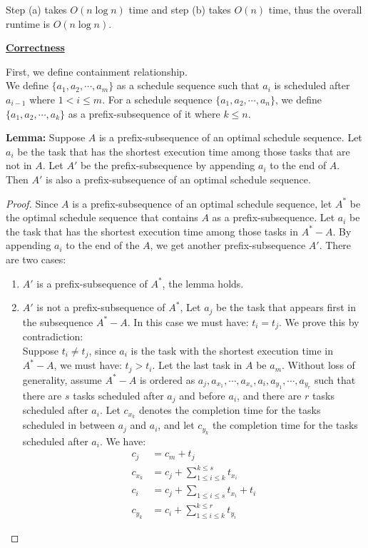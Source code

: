 \documentclass[11pt]{article}
\begin{document}
\begin{enumerate}
\begin{enumerate}
Step (a) takes $O(n\log n)$ time and step (b) takes $O(n)$ time, thus
the overall runtime is $O(n\log n)$.

\underline{\textbf{Correctness}}

First, we define containment relationship.\\
We define $\{a_1,a_2,\cdots,a_m\}$ as a schedule sequence such that $a_i$
is scheduled after $a_{i-1}$ where $1 < i \leq m$.
For a schedule sequence $\{a_1,a_2,\cdots,a_n\}$, we define
$\{a_1,a_2,\cdots,a_k\}$ as a prefix-subsequence of it where $k \leq n$.

\textbf{Lemma:} Suppose $A$ is a prefix-subsequence of an optimal schedule
sequence. Let $a_i$ be the task that has the shortest execution time
among those tasks that are not in $A$. Let $A'$ be the
prefix-subsequence by appending $a_i$ to the end of $A$.
Then $A'$ is also a prefix-subsequence of an optimal schedule sequence.

\begin{proof}
  Since $A$ is a prefix-subsequence of an optimal schedule sequence,
  let $A^*$ be the optimal schedule sequence that contains $A$ as a
  prefix-subsequence. Let $a_i$ be the task that has the shortest
  execution time among those tasks in $A^*-A$. By appending $a_i$ to
  the end of the $A$, we get another prefix-subsequence $A'$. There
  are two cases:
  \begin{enumerate}
  \item $A'$ is a prefix-subsequence of $A^*$, the lemma holds.
  \item $A'$ is not a prefix-subsequence of $A^*$, Let $a_j$ be the
    task that appears first in the subsequence $A^*-A$. In
    this case we must have: $t_i = t_j$. We prove this by 
    contradiction:\\
    Suppose $t_i \neq t_j$, since $a_i$ is the task with the shortest
    execution time in $A^*-A$, we must have: $t_j > t_i$. Let the last
    task in $A$ be $a_m$. Without loss of generality, assume $A^*-A$
    is ordered as
    $a_j,a_{x_1},\cdots,a_{x_s},a_i,a_{y_1},\cdots,a_{y_r}$ such that
    there are $s$ tasks scheduled after $a_j$ and before $a_i$, and
    there are $r$ tasks scheduled after $a_i$. Let $c_{x_k}$ denotes
    the completion time for the tasks scheduled in between $a_j$ and
    $a_i$, and let $c_{y_k}$ the completion time for the tasks
    scheduled after $a_i$. We have:
    \begin{align}
      c_j &= c_m + t_j\\
      c_{x_k} &= c_j + \sum_{1 \leq i \leq k}^{k \leq s}t_{x_i}\\
      c_i &= c_j + \sum_{1 \leq i \leq s}t_{x_i} + t_i\\
      c_{y_k} &= c_i + \sum_{1 \leq i \leq k}^{k \leq r}t_{y_i}
    \end{align}


\end{enumerate}
\end{proof}
\end{enumerate}
\end{enumerate}
\end{document}
